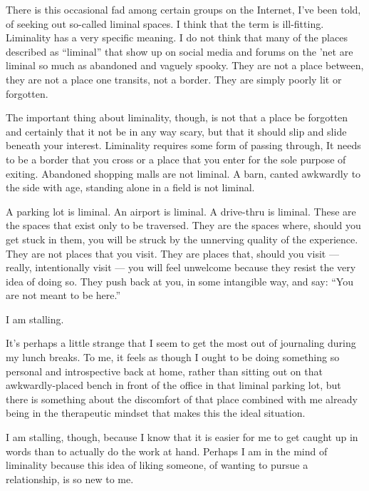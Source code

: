 There is this occasional fad among certain groups on the Internet, I've been told, of seeking out so-called liminal spaces. I think that the term is ill-fitting. Liminality has a very specific meaning. I do not think that many of the places described as ``liminal'' that show up on social media and forums on the 'net are liminal so much as abandoned and vaguely spooky. They are not a place between, they are not a place one transits, not a border. They are simply poorly lit or forgotten.

The important thing about liminality, though, is not that a place be forgotten and certainly that it not be in any way scary, but that it should slip and slide beneath your interest. Liminality requires some form of passing through, It needs to be a border that you cross or a place that you enter for the sole purpose of exiting. Abandoned shopping malls are not liminal. A barn, canted awkwardly to the side with age, standing alone in a field is not liminal.

A parking lot is liminal. An airport is liminal. A drive-thru is liminal. These are the spaces that exist only to be traversed. They are the spaces where, should you get stuck in them, you will be struck by the unnerving quality of the experience. They are not places that you visit. They are places that, should you visit --- really, intentionally visit --- you will feel unwelcome because they resist the very idea of doing so. They push back at you, in some intangible way, and say: ``You are not meant to be here.''

I am stalling.

It's perhaps a little strange that I seem to get the most out of journaling during my lunch breaks. To me, it feels as though I ought to be doing something so personal and introspective back at home, rather than sitting out on that awkwardly-placed bench in front of the office in that liminal parking lot, but there is something about the discomfort of that place combined with me already being in the therapeutic mindset that makes this the ideal situation.

I am stalling, though, because I know that it is easier for me to get caught up in words than to actually do the work at hand. Perhaps I am in the mind of liminality because this idea of liking someone, of wanting to pursue a relationship, is so new to me.

